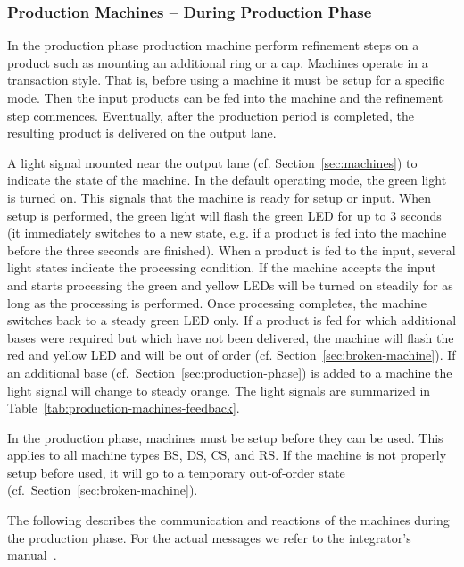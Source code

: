\documentclass[12pt,twoside]{article}
\newcommand{\refsec}[1]{Section~\ref{#1}}
\newcommand{\reftab}[1]{Table~\ref{#1}}
\begin{document}
\vspace*{-2mm}
\subsubsection{Production Machines -- During Production Phase}
\label{sec:production-machines-production}
In the production phase production machine perform refinement steps on
a product such as mounting an additional ring or a cap. Machines
operate in a transaction style. That is, before using a machine it
must be setup for a specific mode. Then the input products can be fed
into the machine and the refinement step commences. Eventually, after
the production period is completed, the resulting product is delivered
on the output lane.

A light signal mounted near the output lane
(cf. \refsec{sec:machines}) to indicate the state of the machine. In
the default operating mode, the green light is turned on. This signals
that the machine is ready for setup or input. When setup is performed,
the green light will flash the green LED for up to 3 seconds (it
immediately switches to a new state, e.g. if a product is fed into the
machine before the three seconds are finished). When a product is fed
to the input, several light states indicate the processing
condition. If the machine accepts the input and starts processing the
green and yellow LEDs will be turned on steadily for as long as the
processing is performed. Once processing completes, the machine
switches back to a steady green LED only. If a product is fed for
which additional bases were required but which have not been
delivered, the machine will flash the red and yellow LED and will be
out of order (cf. \refsec{sec:broken-machine}). If an additional base
(cf.~\refsec{sec:production-phase}) is added to a machine the light
signal will change to steady orange. The light signals are summarized
in \reftab{tab:production-machines-feedback}.

In the production phase, machines must be setup before they can be
used. This applies to all machine types BS, DS, CS, and RS. If the
machine is not properly setup before used, it will go to a temporary
out-of-order state (cf.~\refsec{sec:broken-machine}).

The following describes the communication and reactions of the
machines during the production phase. For the actual messages we refer
to the integrator's manual~\cite{RefBoxIntManual}.
\end{document}
